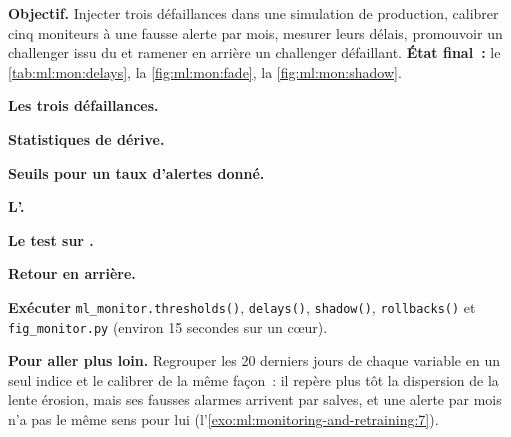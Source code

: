 \begin{tutorial}
\textbf{Objectif.} Injecter trois défaillances dans une simulation de production, calibrer cinq moniteurs à une fausse alerte par mois, mesurer
leurs délais, promouvoir un challenger issu du  et ramener en arrière un challenger défaillant. \textbf{État final~:} le \cref{tab:ml:mon:delays},
la \cref{fig:ml:mon:fade}, la \cref{fig:ml:mon:shadow}.
\begin{tutsteps}
\item \textbf{Les trois défaillances.}
\label{lst:ml:mon:day}
\item \textbf{Statistiques de dérive.}
\label{lst:ml:mon:psi}
\item \textbf{Seuils pour un taux d'alertes donné.}
\label{lst:ml:mon:calib}
\item \textbf{L'.}
\label{lst:ml:mon:cusum}
\item \textbf{Le test sur .}
\label{lst:ml:mon:shadow}
\item \textbf{Retour en arrière.}
\label{lst:ml:mon:rollback}
\item \textbf{Exécuter} \texttt{ml\_monitor.thresholds()}, \texttt{delays()}, \texttt{shadow()}, \texttt{rollbacks()} et
\texttt{fig\_monitor.py} (environ 15 secondes sur un cœur).
\end{tutsteps}
\textbf{Pour aller plus loin.} Regrouper les 20 derniers jours de chaque variable en un seul indice et le calibrer de la même façon~: il repère plus tôt
la dispersion de la lente érosion, mais ses fausses alarmes arrivent par salves, et une alerte par mois n'a pas le même sens pour lui
(l'\cref{exo:ml:monitoring-and-retraining:7}).
\end{tutorial}


